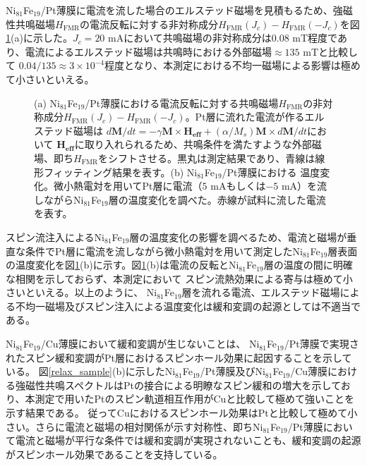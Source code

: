 Ni$_{81}$Fe$_{19}$/Pt薄膜に電流を流した場合のエルステッド磁場を見積もるため、強磁性共鳴磁場$H_\text{FMR}$の電流反転に対する非対称成分$H_\text{FMR}(J_c)-H_\text{FMR}(-J_c)$を図\ref{res_asym}(a)に示した。$J_c=20$ mAにおいて共鳴磁場の非対称成分は0.08 mT程度であり、電流によるエルステッド磁場は共鳴時における外部磁場$\approx 135$ mTと比較して
$0.04/135\approx 3\times10^{-4}$程度となり、本測定における不均一磁場による影響は極めて小さいといえる。　


\begin{figure}[tbp]
 \begin{center}
 \caption{(a) Ni$_{81}$Fe$_{19}$/Pt薄膜における電流反転に対する共鳴磁場$H_\text{FMR}$の非対称成分$H_\text{FMR}(J_c)-H_\text{FMR}(-J_c)$。Pt層に流れた電流が作るエルステッド磁場は
$d\bm{M}/dt=-\gamma\bm{M}\times\bm{H_\text{eff}}+(\alpha/M_s) \bm{M}\times d\bm{M}/dt $において
$\bm{H_\text{eff}}$に取り入れられるため、共鳴条件を満たすような外部磁場、即ち$H_\text{FMR}$をシフトさせる。黒丸は測定結果であり、青線は線形フィッティング結果を表す。(b) Ni$_{81}$Fe$_{19}$/Pt薄膜における
温度変化。微小熱電対を用いてPt層に電流（$5$ mAもしくは$-5$ mA）を流しながらNi$_{81}$Fe$_{19}$層の温度変化を調べた。赤線が試料に流した電流を表す。}
 \label{res_asym}
 \end{center}
\end{figure}




スピン流注入によるNi$_{81}$Fe$_{19}$層の温度変化の影響を調べるため、電流と磁場が垂直な条件でPt層に電流を流しながら微小熱電対を用いて測定したNi$_{81}$Fe$_{19}$層表面の温度変化を図\ref{res_asym}(b)に示す。図\ref{res_asym}(b)は電流の反転とNi$_{81}$Fe$_{19}$層の温度の間に明確な相関を示しておらず、本測定において
スピン流熱効果による寄与は極めて小さいといえる。以上のように、
Ni$_{81}$Fe$_{19}$層を流れる電流、エルステッド磁場による不均一磁場及びスピン注入による温度変化は緩和変調の起源としては不適当である。




Ni$_{81}$Fe$_{19}$/Cu薄膜において緩和変調が生じないことは、
Ni$_{81}$Fe$_{19}$/Pt薄膜で実現されたスピン緩和変調がPt層におけるスピンホール効果に起因することを示している。
図\ref{relax_sample}(b)に示したNi$_{81}$Fe$_{19}$/Pt薄膜及びNi$_{81}$Fe$_{19}$/Cu薄膜における強磁性共鳴スペクトルはPtの接合による明瞭なスピン緩和の増大を示しており、本測定で用いたPtのスピン軌道相互作用がCuと比較して極めて強いことを示す結果である。
従ってCuにおけるスピンホール効果はPtと比較して極めて小さい。さらに電流と磁場の相対関係が示す対称性、即ちNi$_{81}$Fe$_{19}$/Pt薄膜において電流と磁場が平行な条件では緩和変調が実現されないことも、緩和変調の起源がスピンホール効果であることを支持している。


